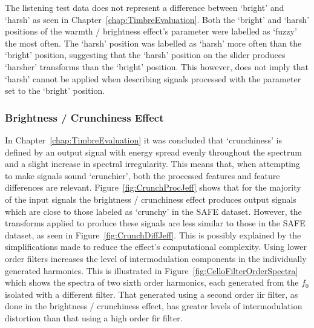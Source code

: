 			The listening test data does not represent a difference between `bright' and `harsh' as seen in
			Chapter~\ref{chap:TimbreEvaluation}. Both the `bright' and `harsh' positions of the warmth /
			brightness effect's parameter were labelled as `fuzzy' the most often. The `harsh' position was
			labelled as `harsh' more often than the `bright' position, suggesting that the `harsh' position on
			the slider produces `harsher' transforms than the `bright' position. This however, does not imply
			that `harsh' cannot be applied when describing signals processed with the parameter set to the
			`bright' position.
			
		\subsubsection*{Brightness / Crunchiness Effect}
			In Chapter~\ref{chap:TimbreEvaluation} it was concluded that `crunchiness' is defined by an output
			signal with energy spread evenly throughout the spectrum and a slight increase in spectral
			irregularity. This means that, when attempting to make signals sound `crunchier', both the
			processed features and feature differences are relevant.  Figure~\ref{fig:CrunchProcJeff} shows
			that for the majority of the input signals the brightness / crunchiness effect produces output
			signals which are close to those labeled as `crunchy' in the SAFE dataset. However, the transforms
			applied to produce these signals are less similar to those in the SAFE dataset, as seen in
			Figure~\ref{fig:CrunchDiffJeff}. This is possibly explained by the simplifications made to reduce
			the effect's computational complexity. Using lower order filters increases the level of
			intermodulation components in the individually generated harmonics. This is illustrated in
			Figure~\ref{fig:CelloFilterOrderSpectra} which shows the spectra of two sixth order harmonics, each
			generated from the $f_{0}$ isolated with a different filter. That generated using a second order
			\acrshort{iir} filter, as done in the brightness / crunchiness effect, has greater levels of
			intermodulation distortion than that using a high order \acrshort{fir} filter. 
			
